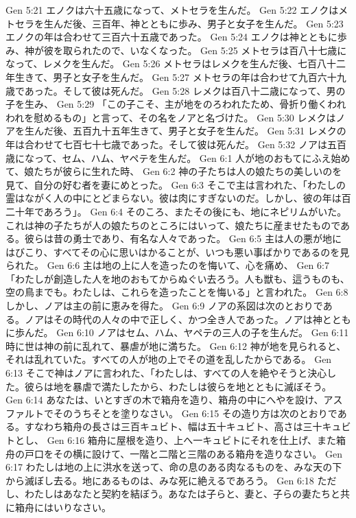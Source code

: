 Gen 5:21  エノクは六十五歳になって、メトセラを生んだ。
Gen 5:22  エノクはメトセラを生んだ後、三百年、神とともに歩み、男子と女子を生んだ。
Gen 5:23  エノクの年は合わせて三百六十五歳であった。
Gen 5:24  エノクは神とともに歩み、神が彼を取られたので、いなくなった。
Gen 5:25  メトセラは百八十七歳になって、レメクを生んだ。
Gen 5:26  メトセラはレメクを生んだ後、七百八十二年生きて、男子と女子を生んだ。
Gen 5:27  メトセラの年は合わせて九百六十九歳であった。そして彼は死んだ。
Gen 5:28  レメクは百八十二歳になって、男の子を生み、
Gen 5:29  「この子こそ、主が地をのろわれたため、骨折り働くわれわれを慰めるもの」と言って、その名をノアと名づけた。
Gen 5:30  レメクはノアを生んだ後、五百九十五年生きて、男子と女子を生んだ。
Gen 5:31  レメクの年は合わせて七百七十七歳であった。そして彼は死んだ。
Gen 5:32  ノアは五百歳になって、セム、ハム、ヤペテを生んだ。
Gen 6:1  人が地のおもてにふえ始めて、娘たちが彼らに生れた時、
Gen 6:2  神の子たちは人の娘たちの美しいのを見て、自分の好む者を妻にめとった。
Gen 6:3  そこで主は言われた、「わたしの霊はながく人の中にとどまらない。彼は肉にすぎないのだ。しかし、彼の年は百二十年であろう」。
Gen 6:4  そのころ、またその後にも、地にネピリムがいた。これは神の子たちが人の娘たちのところにはいって、娘たちに産ませたものである。彼らは昔の勇士であり、有名な人々であった。
Gen 6:5  主は人の悪が地にはびこり、すべてその心に思いはかることが、いつも悪い事ばかりであるのを見られた。
Gen 6:6  主は地の上に人を造ったのを悔いて、心を痛め、
Gen 6:7  「わたしが創造した人を地のおもてからぬぐい去ろう。人も獣も、這うものも、空の鳥までも。わたしは、これらを造ったことを悔いる」と言われた。
Gen 6:8  しかし、ノアは主の前に恵みを得た。
Gen 6:9  ノアの系図は次のとおりである。ノアはその時代の人々の中で正しく、かつ全き人であった。ノアは神とともに歩んだ。
Gen 6:10  ノアはセム、ハム、ヤペテの三人の子を生んだ。
Gen 6:11  時に世は神の前に乱れて、暴虐が地に満ちた。
Gen 6:12  神が地を見られると、それは乱れていた。すべての人が地の上でその道を乱したからである。
Gen 6:13  そこで神はノアに言われた、「わたしは、すべての人を絶やそうと決心した。彼らは地を暴虐で満たしたから、わたしは彼らを地とともに滅ぼそう。
Gen 6:14  あなたは、いとすぎの木で箱舟を造り、箱舟の中にへやを設け、アスファルトでそのうちそとを塗りなさい。
Gen 6:15  その造り方は次のとおりである。すなわち箱舟の長さは三百キュビト、幅は五十キュビト、高さは三十キュビトとし、
Gen 6:16  箱舟に屋根を造り、上へ一キュビトにそれを仕上げ、また箱舟の戸口をその横に設けて、一階と二階と三階のある箱舟を造りなさい。
Gen 6:17  わたしは地の上に洪水を送って、命の息のある肉なるものを、みな天の下から滅ぼし去る。地にあるものは、みな死に絶えるであろう。
Gen 6:18  ただし、わたしはあなたと契約を結ぼう。あなたは子らと、妻と、子らの妻たちと共に箱舟にはいりなさい。

